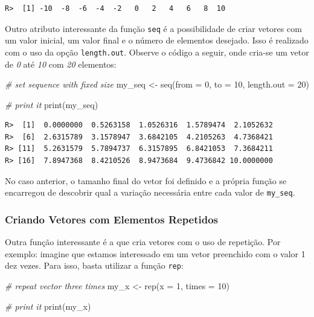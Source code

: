 \documentclass[
  11pt,
]{book}
\newenvironment{Shaded}{\begin{snugshade}}{\end{snugshade}}
\newcommand{\AttributeTok}[1]{\textcolor[rgb]{0.61,0.61,0.61}{#1}}
\newcommand{\CommentTok}[1]{\textcolor[rgb]{0.37,0.37,0.37}{\textit{#1}}}
\newcommand{\DecValTok}[1]{\textcolor[rgb]{0.06,0.06,0.06}{#1}}
\newcommand{\FunctionTok}[1]{\textcolor[rgb]{0,0,0}{#1}}
\newcommand{\NormalTok}[1]{#1}
\newcommand{\OtherTok}[1]{\textcolor[rgb]{0.37,0.37,0.37}{#1}}
\begin{document}
\begin{verbatim}
R>  [1] -10  -8  -6  -4  -2   0   2   4   6   8  10
\end{verbatim}

Outro atributo interessante da função \texttt{seq} é a possibilidade de criar vetores com um valor inicial, um valor final e o número de elementos desejado. Isso é realizado com o uso da opção \texttt{length.out}. Observe o código a seguir, onde cria-se um vetor de \emph{0} até \emph{10} com \emph{20} elementos:

\begin{Shaded}
\begin{Highlighting}[]
\CommentTok{\# set sequence with fixed size}
\NormalTok{my\_seq }\OtherTok{\textless{}{-}} \FunctionTok{seq}\NormalTok{(}\AttributeTok{from =} \DecValTok{0}\NormalTok{, }\AttributeTok{to =} \DecValTok{10}\NormalTok{, }\AttributeTok{length.out =} \DecValTok{20}\NormalTok{)}

\CommentTok{\# print it}
\FunctionTok{print}\NormalTok{(my\_seq)}
\end{Highlighting}
\end{Shaded}

\begin{verbatim}
R>  [1]  0.0000000  0.5263158  1.0526316  1.5789474  2.1052632
R>  [6]  2.6315789  3.1578947  3.6842105  4.2105263  4.7368421
R> [11]  5.2631579  5.7894737  6.3157895  6.8421053  7.3684211
R> [16]  7.8947368  8.4210526  8.9473684  9.4736842 10.0000000
\end{verbatim}

No caso anterior, o tamanho final do vetor foi definido e a própria função se encarregou de descobrir qual a variação necessária entre cada valor de \texttt{my\_seq}.

\hypertarget{criando-vetores-com-elementos-repetidos}{%
\subsubsection{Criando Vetores com Elementos Repetidos}\label{criando-vetores-com-elementos-repetidos}}

Outra função interessante é a que cria vetores com o uso de repetição. Por exemplo: imagine que estamos interessado em um vetor preenchido com o valor 1 dez vezes. Para isso, basta utilizar a função \texttt{rep}: 

\begin{Shaded}
\begin{Highlighting}[]
\CommentTok{\# repeat vector three times}
\NormalTok{my\_x }\OtherTok{\textless{}{-}} \FunctionTok{rep}\NormalTok{(}\AttributeTok{x =} \DecValTok{1}\NormalTok{, }\AttributeTok{times =} \DecValTok{10}\NormalTok{)}

\CommentTok{\# print it}
\FunctionTok{print}\NormalTok{(my\_x)}
\end{Highlighting}
\end{Shaded}
\end{document}
